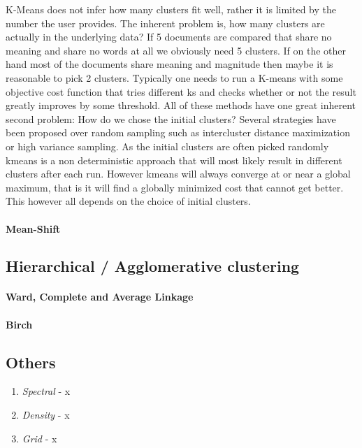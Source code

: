     K-Means does not infer how many clusters fit well, rather it is limited by the number the user provides. The inherent problem is, how many clusters are actually in the underlying data? If 5 documents are compared that share no meaning and share no words at all we obviously need 5 clusters. If on the other hand most of the documents share meaning and magnitude then maybe it is reasonable to pick 2 clusters. Typically one needs to run a K-means with some objective cost function that tries different ks and checks whether or not the result greatly improves by some threshold. 
    All of these methods have one great inherent second problem: How do we chose the initial clusters? Several strategies have been proposed over random sampling such as intercluster distance maximization or high variance sampling. As the initial clusters are often picked randomly kmeans is a non deterministic approach that will most likely result in different clusters after each run. However kmeans will always converge at or near a global maximum, that is it will find a globally minimized cost that cannot get better. This however all depends on the choice of initial clusters.

    \paragraph{Mean-Shift}

  \subsection{Hierarchical / Agglomerative clustering}
    \paragraph{Ward, Complete and Average Linkage}
    \paragraph{Birch}

    \subsection{Others}
      \begin{enumerate}
        \item \emph{Spectral} - x
        \item \emph{Density} - x
        \item \emph{Grid} - x
      \end{enumerate}

